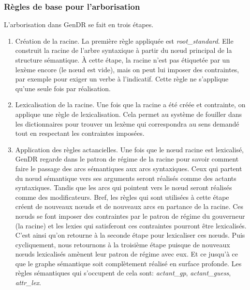 \subsubsection{Règles de base pour l'arborisation}
L'arborisation dans GenDR se fait en trois étapes.

\begin{enumerate}
  \item Création de la racine.
  La première règle appliquée est \emph{root\_standard}. Elle construit la racine de l'arbre syntaxique à partir du n\oe{}ud principal de la structure sémantique. À cette étape, la racine n'est pas étiquetée par un lexème encore (le n\oe{}ud est vide), mais on peut lui imposer des contraintes, par exemple pour exiger un verbe à l'indicatif. Cette règle ne s'applique qu'une seule fois par réalisation.

  \item Lexicalisation de la racine.
  Une fois que la racine a été créée et contrainte, on applique une règle de lexicalisation. Cela permet au système de fouiller dans les dictionnaires pour trouver un lexème qui correspondra au sens demandé tout en respectant les contraintes imposées.

  \item Application des règles actancielles.
  Une fois que le n\oe{}ud racine est lexicalisé, GenDR regarde dans le patron de régime de la racine pour savoir comment faire le passage des arcs sémantiques aux arcs syntaxiques. Ceux qui partent du n\oe{}ud sémantique vers ses arguments seront réalisés comme des actants syntaxiques. Tandis que les arcs qui pointent vers le n\oe{}ud seront réalisés comme des modificateurs. Bref, les règles qui sont utilisées à cette étape créent de nouveaux n\oe{}uds et de nouveaux arcs en partance de la racine. Ces n\oe{}uds se font imposer des contraintes par le patron de régime du gouverneur (la racine) et les lexies qui satisferont ces contraintes pourront être lexicalisés. C'est ainsi qu'on retourne à la seconde étape pour lexicaliser ces n\oe{}uds. Puis cycliquement, nous retournons à la troisième étape puisque de nouveaux n\oe{}uds lexicalisés amènent leur patron de régime avec eux. Et ce jusqu'à ce que le graphe sémantique soit complètement réalisé en surface profonde. Les règles sémantiques qui s'occupent de cela sont: \emph{actant\_gp}, \emph{actant\_guess}, \emph{attr\_lex}.
\end{enumerate}

